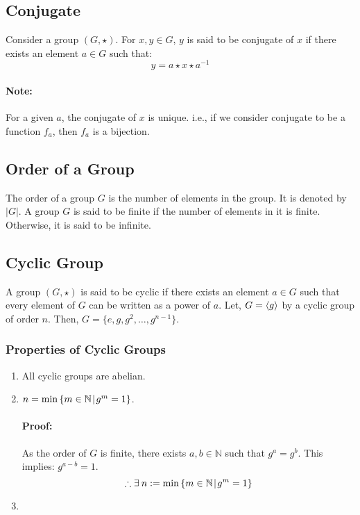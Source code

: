 \documentclass[12pt, oneside]{book}
\DeclarePairedDelimiter{\evdel}{\langle}{\rangle}
\newcommand{\ev}{\evdel}
\begin{document}
\subsection{Conjugate}
Consider a group \( \left(G, \star \right) \).
For \(x,y \in G\), \(y\) is said to be conjugate of \(x\) if there exists an element \(a \in G\) such that:
\[ y = a \star x \star a^{-1} \]
\paragraph{Note:} For a given \(a\), the conjugate of \(x\) is unique.
i.e., if we consider conjugate to be a function \(f_a\), then \(f_a\) is a bijection.

\subsection{Order of a Group}
The order of a group \(G\) is the number of elements in the group.
It is denoted by \(|G|\).
A group \(G\) is said to be finite if the number of elements in it is finite.
Otherwise, it is said to be infinite.

\subsection{Cyclic Group}
A group \( \left(G, \star \right) \) is said to be cyclic if there exists an element \(a \in G\) such that every element of \(G\) can be written as a power of \(a\).
Let, \(G = \ev{g}\) by a cyclic group of order \(n\).
Then, \(G = \{e, g, g^2, \ldots, g^{n-1}\}\).
\subsubsection{Properties of Cyclic Groups}
\begin{enumerate}
    \item All cyclic groups are abelian.
    \item \(n = \min{ \left\{m \in \mathbb{N} \: \vline \: g^m = 1\right\} }\).

    \paragraph{Proof:} As the order of \(G\) is finite, there exists \(a,b \in \mathbb{N}\) such that \(g^a = g^b\). 
    This implies: \(g^{a-b} = 1\).
    \[ \therefore \exists \: n := \min{ \left\{m \in \mathbb{N} \: \vline \: g^m = 1\right\} } \]

    \item 
\end{enumerate}
\end{document}
